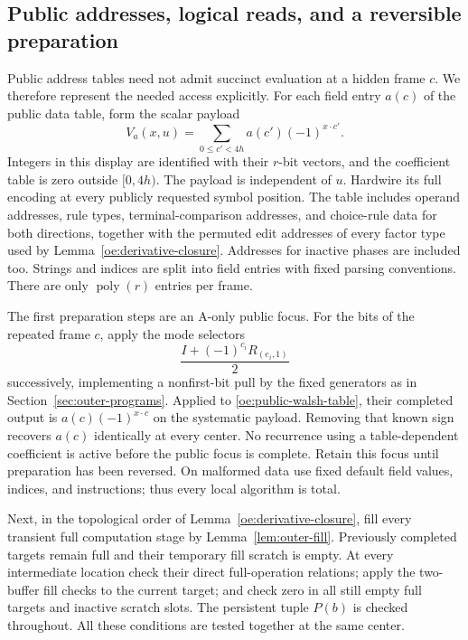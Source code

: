 \subsection{Public addresses, logical reads, and a reversible preparation}

Public address tables need not admit succinct evaluation at a hidden
frame $c$. We therefore represent the needed access explicitly. For each
field entry $a(c)$ of the public data table, form the scalar payload
\begin{equation}\label{oe:public-walsh-table}
 V_a(x,u)=\sum_{0\leq c'<4h}a(c')(-1)^{x\cdot c'}.
\end{equation}
Integers in this display are identified with their $r$-bit vectors, and
the coefficient table is zero outside $[0,4h)$. The payload is independent
of $u$. Hardwire its full encoding at every publicly requested symbol
position. The table includes operand addresses, rule types,
terminal-comparison addresses, and choice-rule data for both directions,
together with the
permuted edit addresses of every factor type used by
Lemma~\ref{oe:derivative-closure}. Addresses for inactive phases are
included too. Strings and indices are split into field entries with fixed
parsing conventions. There are only $\operatorname{poly}(r)$ entries per
frame.

The first preparation steps are an A-only public focus. For the bits of
the repeated frame $c$, apply the mode selectors
\[
 \frac{I+(-1)^{c_i}R_{(e_i,1)}}2
\]
successively, implementing a nonfirst-bit pull by the fixed generators
as in Section~\ref{sec:outer-programs}. Applied to
\eqref{oe:public-walsh-table}, their completed output is
$a(c)(-1)^{x\cdot c}$ on the systematic payload. Removing that known sign
recovers $a(c)$ identically at every center. No recurrence using a
table-dependent coefficient is active before the public focus is
complete. Retain this focus until preparation has been reversed. On
malformed data use fixed default field values, indices, and instructions;
thus every local algorithm is total.

Next, in the topological order of Lemma~\ref{oe:derivative-closure}, fill
every transient full computation stage by Lemma~\ref{lem:outer-fill}.
Previously completed targets remain full and their temporary fill scratch
is empty. At every intermediate location check their direct full-operation
relations; apply the two-buffer fill checks to the current target; and
check zero in all still empty full targets and inactive scratch slots.
The persistent tuple $P(b)$ is checked throughout. All these conditions
are tested together at the same center.


